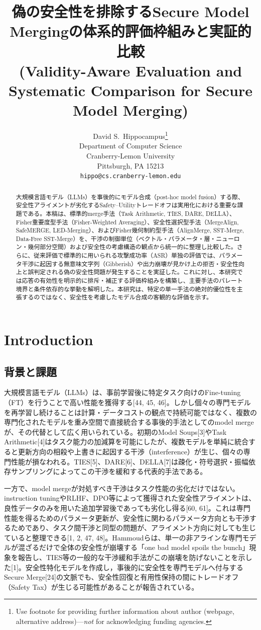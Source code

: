 \documentclass{article}
\title{偽の安全性を排除するSecure Model Mergingの体系的評価枠組みと実証的比較\\(Validity-Aware Evaluation and Systematic Comparison for Secure Model Merging)}
\author{%
  David S.~Hippocampus\thanks{Use footnote for providing further information
    about author (webpage, alternative address)---\emph{not} for acknowledging
    funding agencies.} \\
  Department of Computer Science\\
  Cranberry-Lemon University\\
  Pittsburgh, PA 15213 \\
  \texttt{hippo@cs.cranberry-lemon.edu} \\
}
\begin{document}
\maketitle


\begin{abstract}
大規模言語モデル（LLMs）を事後的にモデル合成（post-hoc model fusion）する際、安全性アライメントが劣化するSafety--Utilityトレードオフは実用化における重要な課題である。本稿は、標準的merge手法（Task Arithmetic, TIES, DARE, DELLA）、Fisher重要度型手法（Fisher-Weighted Averaging）、安全性選択型手法（MergeAlign, SafeMERGE, LED-Merging）、およびFisher幾何制約型手法（AlignMerge, SST-Merge, Data-Free SST-Merge）を、干渉の制御単位（ベクトル・パラメータ・層・ニューロン・幾何部分空間）および安全性の考慮構造の観点から統一的に整理し比較した。さらに、従来評価で標準的に用いられる攻撃成功率（ASR）単独の評価では、パラメータ干渉に起因する無意味文字列（Gibberish）や出力崩壊が見かけ上の拒否・安全性向上と誤判定される偽の安全性問題が発生することを実証した。これに対し、本研究では応答の有効性を明示的に排斥・補正する評価枠組みを構築し、主要手法のパレート境界と条件依存的な挙動を解明した。本研究は、特定の単一手法の絶対的優位性を主張するのではなく、安全性を考慮したモデル合成の客観的な評価を示す。
\end{abstract}

\section{Introduction}
\subsection{背景と課題 }
大規模言語モデル（LLMs）は、事前学習後に特定タスク向けのFine-tuning（FT）を行うことで高い性能を獲得する[44, 45, 46]。しかし個々の専門モデルを再学習し続けることは計算・データコストの観点で持続可能ではなく、複数の専門化されたモデルを重み空間で直接統合する事後的手法としてのmodel mergeが、その代替として広く用いられている。初期のModel Soups[3]やTask Arithmetic[4]はタスク能力の加減算を可能にしたが、複数モデルを単純に統合すると更新方向の相殺や上書きに起因する干渉（interference）が生じ、個々の専門性能が損なわれる。TIES[5]、DARE[6]、DELLA[7]は疎化・符号選択・振幅依存サンプリングによってこの干渉を緩和する代表的手法である。

一方で、model mergeが対処すべき干渉はタスク性能の劣化だけではない。instruction tuningやRLHF、DPO等によって獲得された安全性アライメントは、良性データのみを用いた追加学習後であっても劣化し得る[60, 61]。これは専門性能を得るためのパラメータ更新が、安全性に関わるパラメータ方向とも干渉するためであり、タスク間干渉と同型の問題が、アライメント方向に対しても生じていると整理できる[1, 2, 47, 48]。Hammoudらは、単一の非アラインな専門モデルが混ざるだけで全体の安全性が崩壊する「one bad model spoils the bunch」現象を報告し、TIES等の一般的な干渉緩和手法がこの崩壊を防げないことを示した[1]。安全性特化モデルを作成し，事後的に安全性を専門モデルへ付与するSecure Merge[24]の文脈でも、安全性回復と有用性保持の間にトレードオフ（Safety Tax）が生じる可能性があることが報告されている。
\end{document}
